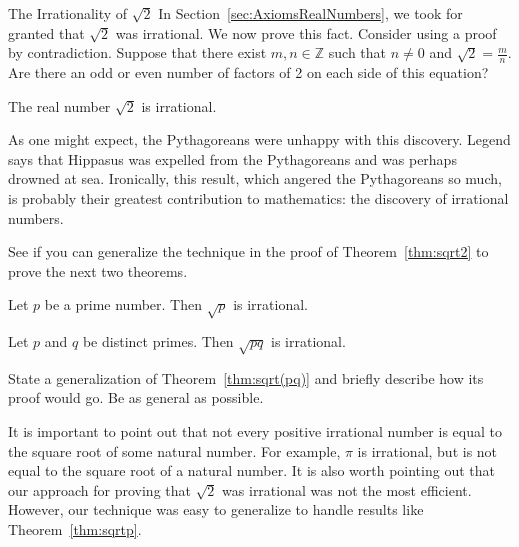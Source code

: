 \begin{section}{The Irrationality of $\sqrt{2}$}
In Section~\ref{sec:AxiomsRealNumbers}, we took for granted that $\sqrt{2}$ was irrational.  We now prove this fact. Consider using a proof by contradiction. Suppose that there exist $m,n\in\mathbb{Z}$ such that $n\ne 0$ and $\sqrt{2}=\frac{m}{n}$. Are there an odd or even number of factors of 2 on each side of this equation?

%

\begin{theorem}\label{thm:sqrt2}
The real number $\sqrt{2}$ is irrational.
\end{theorem}

As one might expect, the Pythagoreans were unhappy with this discovery. Legend says that Hippasus was expelled from the Pythagoreans and was perhaps drowned at sea. Ironically, this result, which angered the Pythagoreans so much, is probably their greatest contribution to mathematics: the discovery of irrational numbers.

See if you can generalize the technique in the proof of Theorem~\ref{thm:sqrt2} to prove the next two theorems.

\begin{theorem}\label{thm:sqrtp}
Let $p$ be a prime number.  Then $\sqrt{p}$ is irrational.
\end{theorem}

\begin{theorem}\label{thm:sqrt(pq)}
Let $p$ and $q$ be distinct primes.  Then $\sqrt{pq}$ is irrational.
\end{theorem}

\begin{problem}
State a generalization of Theorem~\ref{thm:sqrt(pq)} and briefly describe how its proof would go.  Be as general as possible.
\end{problem}

It is important to point out that not every positive irrational number is equal to the square root of some natural number.  For example, $\pi$ is irrational, but is not equal to the square root of a natural number. It is also worth pointing out that our approach for proving that $\sqrt{2}$ was irrational was not the most efficient.  However, our technique was easy to generalize to handle results like Theorem~\ref{thm:sqrtp}.

\end{section}
